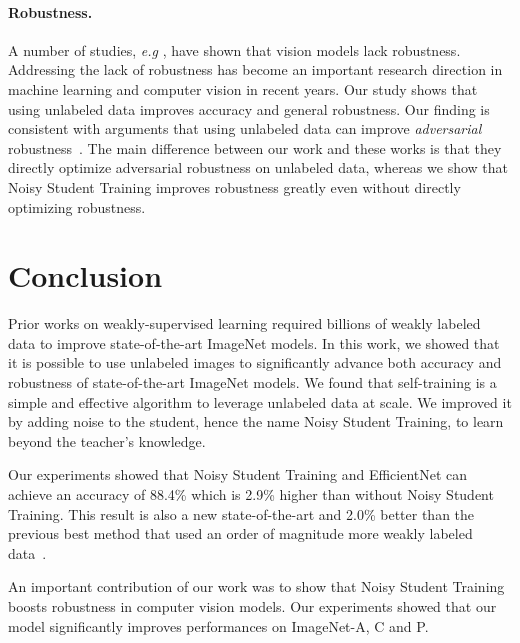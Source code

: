 \documentclass[10pt,twocolumn,letterpaper]{article}
\def\eg{\emph{e.g}\onedot}
\begin{document}
\paragraph{Robustness.} A number of studies, \eg{} \cite{szegedy2013intriguing,hendrycks2018benchmarking,recht2019imagenet,gu2019using}, have shown that vision models lack robustness. 
Addressing the lack of robustness has become an important research direction in machine learning and computer vision in recent years. Our study shows that using unlabeled data improves accuracy and general robustness.
Our finding is consistent with arguments that using unlabeled data can improve \emph{adversarial} robustness~\cite{carmon2019unlabeled,stanforth2019labels,najafi2019robustness,zhai2019adversarially}. 
The main difference between our work and these works is that they directly  optimize adversarial robustness on unlabeled data, whereas we show that Noisy Student Training improves robustness greatly even without directly optimizing robustness. 

\section{Conclusion}
Prior works on weakly-supervised learning  required billions of weakly labeled data to improve state-of-the-art ImageNet models. In this work, we showed that it is possible to use unlabeled images to significantly advance both accuracy and robustness of state-of-the-art ImageNet models. We found that self-training is a simple and effective algorithm to leverage unlabeled data at scale. We improved it by adding noise to the student, hence the name Noisy Student Training, to learn beyond the teacher's knowledge. 

Our experiments showed that Noisy Student Training and EfficientNet can achieve an accuracy of 88.4\% which is 2.9\% higher than without Noisy Student Training. This result is also a new state-of-the-art and 2.0\% better than the previous best method that used an order of magnitude more weakly labeled data~\cite{mahajan2018exploring,touvron2019fixing}.

An important contribution of our work was to show that  Noisy Student Training boosts robustness in computer vision models. Our experiments showed that our model significantly improves performances on ImageNet-A, C and P.
\end{document}
